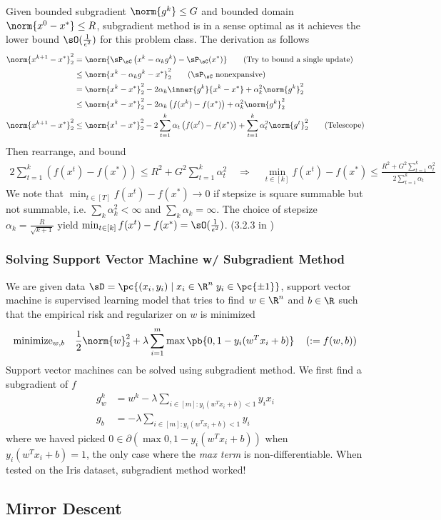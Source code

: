 \documentclass[../summary.tex]{subfiles}
\begin{document}
Given bounded subgradient $\norm{g^k}\leq G$ and bounded domain $\norm{x^0 - x^*} \leq R$, subgradient method is in a sense optimal as it achieves the lower bound $\sO(\frac{1}{\epsilon^2})$ for this problem class. The derivation as follows
\begin{align*}
    \norm{x^{k+1} - x^*}_2^2
        &= \norm{\sP_{\sC}\left(x^k - \alpha_k g^k\right) -  \sP_{\sC}(x^*)} 
            \tag{Try to bound a single update} \\
        &\leq \norm{x^k - \alpha_k g^k - x^*}_2^2
                \tag{$\sP_{\sC}$ nonexpansive} \\ 
        &= \norm{x^k-x^*}_2^2 - 2\alpha_k \inner{g^k}{x^k-x^*} + \alpha_k^2 \norm{g^k}_2^2 \\
        &\leq \norm{x^k-x^*}_2^2 - 2\alpha_k \left( f(x^k) - f(x^*) \right) + \alpha_k^2 \norm{g^k}_2^2 \\
    \norm{x^{k+1} - x^*}_2^2
        &\leq \norm{x^1 - x^*}_2^2 - 2\sum_{t=1}^{k} \alpha_t\left(f(x^t) - f(x^*)\right) + \sum_{t=1}^k \alpha_t^2 \norm{g^t}_2^2
            \tag{Telescope} 
\end{align*} 
Then rearrange, and bound 
\begin{align*} 
    2\sum_{t=1}^k \left(f(x^t) - f(x^*)\right)
        \leq R^2 + G^2 \sum_{t=1}^k \alpha_t^2 \quad\Rightarrow\quad
    \min_{t\in[k]} f(x^t) - f(x^*) 
        \leq \frac{R^2 + G^2\sum_{t=1}^k \alpha_t^2}{2\sum_{t=1}^k \alpha_t}
\end{align*} 
We note that $\min_{t\in[T]} f(x^t) - f(x^*) \to 0$ if stepsize is square summable but not summable, i.e. $\sum_k \alpha_k^2 < \infty$ and $\sum_k \alpha_k = \infty$. The choice of stepsize $\alpha_k = \frac{R}{\sqrt{k+1}}$ yield $\min_{t\in[k]} f(x^t) - f(x^*) = \sO(\frac{1}{\epsilon^2})$. (3.2.3 in \cite{nesterovIntroductoryLecturesConvex2004})
 
 
\subsubsection{Solving Support Vector Machine w/ Subgradient Method}

We are given data $\sD = \pc{(x_i,y_i) \mid x_i\in\R^n \; y_i \in \pc{\pm 1}}$, support vector machine is supervised learning model that tries to find $w\in\R^n$ and $b\in\R$ such that the empirical risk and regularizer on $w$ is minimized
\begin{align*}
    \text{minimize}_{w,b} \quad
        \frac{1}{2} \norm{w}_2^2 + \lambda \sum_{i=1}^m \max\pb{0, 1 - y_i(w^Tx_i + b)} 
        \quad \left( := f(w,b) \right)
\end{align*}
Support vector machines can be solved using subgradient method. We first find a subgradient of $f$
\begin{align*}
    g_w^k
        &= w^k - \lambda \sum_{i\in[m]: y_i(w^Tx_i + b) < 1 } y_i x_i \\
    g_b
        &= -\lambda \sum_{i\in[m]: y_i(w^Tx_i + b) < 1 } y_i
\end{align*}
where we haved picked $0\in\partial (\max{0, 1- y_i(w^Tx_i + b)})$ when $y_i(w^Tx_i + b) = 1$, the only case where the \textit{max term} is non-differentiable. When tested on the Iris dataset, subgradient method worked!


\subsection{Mirror Descent}
 
\end{document}
